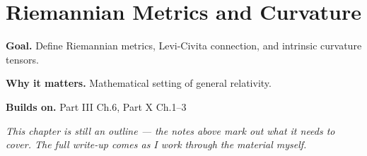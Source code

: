 \chapter{Riemannian Metrics and Curvature}
\label{ch:10-differential-geometry-04}

\begin{chapterintro}
\textbf{Goal.} Define Riemannian metrics, Levi-Civita connection, and intrinsic curvature tensors.

\textbf{Why it matters.} Mathematical setting of general relativity.

\textbf{Builds on.} Part III Ch.6, Part X Ch.1–3
\end{chapterintro}

\textit{This chapter is still an outline --- the notes above mark out what it needs to cover. The full write-up comes as I work through the material myself.}
